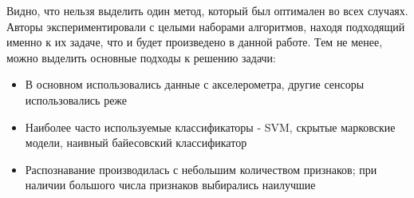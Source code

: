 Видно, что нельзя выделить один метод, который был оптимален во всех случаях. Авторы экспериментировали с целыми наборами алгоритмов, находя подходящий именно к их задаче, что и будет произведено в данной работе. Тем не менее, можно выделить основные подходы к решению задачи:

\begin{itemize}
\item В основном использовались данные с акселерометра, другие сенсоры использовались реже
\item Наиболее часто используемые классификаторы - SVM, скрытые марковские модели, наивный байесовский классификатор
\item Распознавание производилась с небольшим количеством признаков; при наличии большого числа признаков выбирались наилучшие
\end{itemize}


